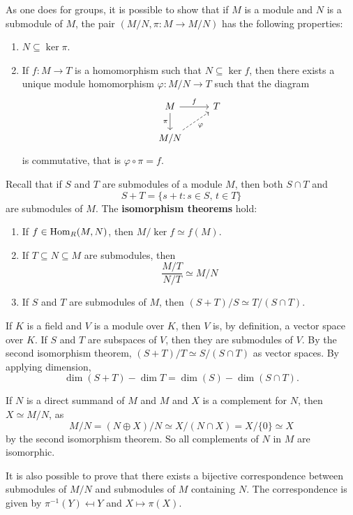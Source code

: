 As one does for groups, it is possible to show that if $M$ is a 
module and $N$ is a submodule of $M$, the pair 
$(M/N,\pi\colon M\to M/N)$ has the following properties:
\begin{enumerate}
\item $N\subseteq \ker \pi$.
\item If $f\colon M\to T$ is a homomorphism such that $N\subseteq \ker f$, then there exists a 
unique module homomorphism $\varphi\colon M/N\to T$ such that 
the diagram
\[
\begin{tikzcd}
	M & T \\
	{M/N}
	\arrow["\pi"', from=1-1, to=2-1]
	\arrow["f", from=1-1, to=1-2]
	\arrow["{\varphi }"', dashed, from=2-1, to=1-2]
\end{tikzcd}
\]
is commutative, that is 
$\varphi\circ\pi =f$.  
\end{enumerate}

Recall that if $S$ and $T$ are submodules of a module $M$, then 
both $S\cap T$ and 
\[
S+T=\{s+t:s\in S,\,t\in T\}
\]
are submodules of $M$. 
The \textbf{isomorphism theorems} hold:
\begin{enumerate}
	\item If $f\in\operatorname{Hom}_R(M,N)$, then $M/\ker f\simeq f(M)$.
	\item If $T\subseteq N\subseteq M$ are submodules, then  
	\[
	\frac{M/T}{N/T}\simeq M/N
	\]
	\item If $S$ and $T$ are submodules of $M$, then $(S+T)/S\simeq T/(S\cap T)$. 
\end{enumerate}

\begin{example}
If $K$ is a field and $V$ is a module over $K$, then $V$ is, by definition, a vector space over $K$. 
If $S$ and $T$ are subspaces of $V$, then they are submodules of $V$. 
By the second isomorphism theorem, $(S+T)/T\simeq S/(S\cap T)$ 
as vector spaces. By applying dimension,  
\[
\dim(S+T)-\dim T=\dim(S)-\dim(S\cap T).
\]
\end{example}

\begin{example}
If $N$ is a direct summand of $M$ and $M$ and $X$ is a complement for $N$, then $X\simeq M/N$, as
\[
M/N=(N\oplus X)/N\simeq X/(N\cap X)=X/\{0\}\simeq X
\]
by the second isomorphism theorem. So all complements of $N$ in $M$ are isomorphic. 
\end{example}

It is also possible to prove that there exists a bijective correspondence between
submodules of $M/N$ and submodules of $M$ containing $N$. The correspondence is given by 
$\pi^{-1}(Y)\mapsfrom Y$ and $X\mapsto \pi(X)$. 

